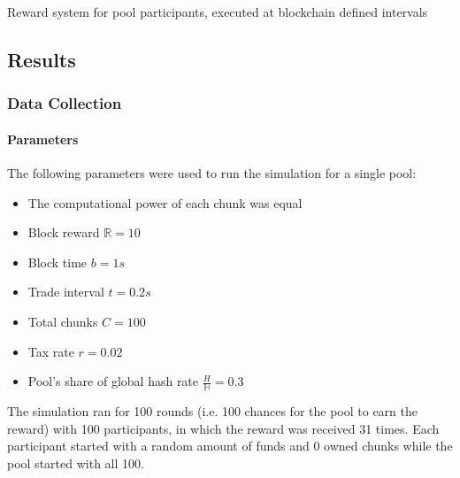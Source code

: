 \begin{algorithm}[H]
  \caption{Reward system for pool participants, executed at blockchain defined intervals}
  \label{algorithm:reward}
  \begin{algorithmic}[1]
     
         
      \EndFor
    \EndProcedure
  \end{algorithmic}
\end{algorithm}

\subsection{Results}

\subsubsection{Data Collection}

\paragraph{Parameters} The following parameters were used to run the simulation for a single pool:

\begin{itemize}
  \item The computational power of each chunk was equal
  \item Block reward $\mathbb{R} = 10$
  \item Block time $b = 1s$
  \item Trade interval $t = 0.2s$
  \item Total chunks $C = 100$
  \item Tax rate $r = 0.02$
  \item Pool's share of global hash rate $\frac{H}{\mathbb{H}} = 0.3$
\end{itemize}
The simulation ran for 100 rounds (i.e. 100 chances for the pool to earn the reward) with 100 participants, in which the reward was received 31 times. Each participant started with a random amount of funds and 0 owned chunks while the pool started with all 100.

